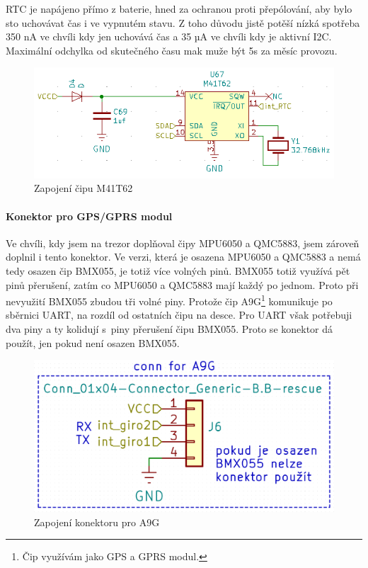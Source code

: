 RTC je napájeno přímo z baterie, hned za ochranou proti přepólování, aby bylo sto uchovávat čas i ve vypnutém stavu.
Z toho důvodu jistě potěší nízká spotřeba 350 nA ve chvíli kdy jen uchovává čas a 35 µA ve chvíli kdy je aktivní I2C.
Maximální odchylka od skutečného času mak muže být 5s za měsíc provozu.

\begin{figure}[htbp]
    \centering
    \includegraphics[width=\textwidth]{kapitoly/obrazky/E4/vnimani/RTC.png}
    \caption{Zapojení čipu M41T62}
    \label{fig:E4-M41T62}
\end{figure}

\newpage

\paragraph{Konektor pro GPS/GPRS modul}
Ve chvíli, kdy jsem na trezor do\-pl\-ňo\-val čipy MPU6050 a QMC5883, jsem zároveň doplnil i tento konektor. Ve verzi, která je osazena MPU6050 a QMC5883 a nemá tedy osazen čip BMX055, 
je totiž více volných pinů. BMX055 totiž využívá pět pinů přerušení, zatím co MPU6050 a QMC5883 mají každý po jednom. Proto při nevyužití BMX055 zbudou tři volné piny.
Protože čip A9G\footnote{Čip využívám jako GPS a GPRS modul.} komunikuje po sběrnici UART, na rozdíl od ostatních čipu na desce. Pro UART však potřebuji
dva piny a ty kolidují s~piny přerušení čipu BMX055. Proto se konektor dá použít, jen pokud není osazen BMX055.

\begin{figure}[htbp]
    \centering
    \includegraphics[width=\textwidth]{kapitoly/obrazky/E4/vnimani/conn-A9G.png}
    \caption{Zapojení konektoru pro A9G}
    \label{fig:E4-A9G}
\end{figure}

